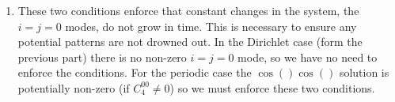 \documentclass[a4paper, 12pt]{article}
\begin{document}
\begin{enumerate}[label={\bf \arabic{*}.\;}, ref={\arabic{*}},itemsep=3ex, left=0ex]
{\begin{enumerate}[label=(\alph*)]
{              The summation accounts for the fact that the zeroth mode $i=j=0$ is $0$. The form of $\lambda(i,j)$ will be as in the periodic case with
              \begin{align}
                k_s(i,j) = \pi^2\left( \frac{i^2}{L_1^2}+ \frac{j^2}{L_2^2}\right).
              \end{align}
            }
          \item{
              These two conditions enforce that constant changes in the system, the $i=j=0$ modes, do not grow in time. This is necessary to ensure any potential patterns are not drowned out. In the Dirichlet case (form the previous part) there is no non-zero $i=j=0$ mode, so we have no need to enforce the conditions. For the periodic case the $\cos()\cos()$ solution is potentially non-zero (if $C_4^{00}\neq 0$) so we must enforce these two conditions.
            }
        \end{enumerate}

      }



\end{enumerate}
\end{document}

